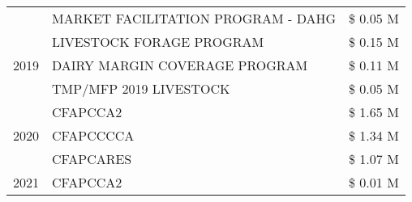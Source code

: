 \begin{tabular}{llr}
 & MARKET FACILITATION PROGRAM - DAHG & \$ 0.05 M \\
\cline{1-3}
\multirow[t]{3}{*}{2019} & LIVESTOCK FORAGE PROGRAM & \$ 0.15 M \\
 & DAIRY MARGIN COVERAGE PROGRAM & \$ 0.11 M \\
 & TMP/MFP 2019 LIVESTOCK & \$ 0.05 M \\
\cline{1-3}
\multirow[t]{3}{*}{2020} & CFAPCCA2 & \$ 1.65 M \\
 & CFAPCCCCA & \$ 1.34 M \\
 & CFAPCARES & \$ 1.07 M \\
\cline{1-3}
2021 & CFAPCCA2 & \$ 0.01 M \\
\cline{1-3}
\bottomrule
\end{tabular}
